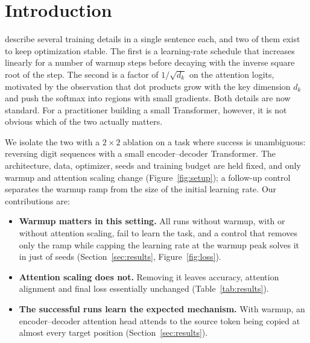 \section{Introduction}
\label{sec:intro}

\citet{vaswani2017attention} describe several training details in a single sentence each, and two of them exist to
keep optimization stable. The first is a learning-rate schedule that increases linearly for a number of warmup
steps before decaying with the inverse square root of the step. The second is a factor of $1/\sqrt{d_k}$ on the
attention logits, motivated by the observation that dot products grow with the key dimension $d_k$ and push the
softmax into regions with small gradients. Both details are now standard. For a practitioner building a small
Transformer, however, it is not obvious which of the two actually matters.

We isolate the two with a $2\times 2$ ablation on a task where success is unambiguous: reversing digit sequences
with a small encoder--decoder Transformer. The architecture, data, optimizer, seeds and training budget are held
fixed, and only warmup and attention scaling change (Figure~\ref{fig:setup}); a follow-up control separates the warmup ramp from the size of the initial
learning rate. Our contributions are:
\begin{itemize}
  \item \textbf{Warmup matters in this setting.} All \valRunsNoWarmup{} runs without warmup, with or without
        attention scaling, fail to learn the task, and a control that removes only the ramp while capping the
        learning rate at the warmup peak solves it in just \valRampSolved{} of \valRampRuns{} seeds (Section~\ref{sec:results}, Figure~\ref{fig:loss}).
  \item \textbf{Attention scaling does not.} Removing it leaves accuracy, attention alignment and final loss
        essentially unchanged (Table~\ref{tab:results}).
  \item \textbf{The successful runs learn the expected mechanism.} With warmup, an encoder--decoder attention head
        attends to the source token being copied at almost every target position (Section~\ref{sec:results}).
\end{itemize}
